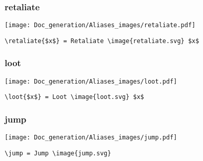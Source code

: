 \documentclass{article}
\begin{document}
\subsubsection{retaliate}
\begin{minipage}{0.45\linewidth}
\raggedright
\begin{spverbatim}
\end{spverbatim}
\end{minipage}
\begin{minipage}{0.45\linewidth}
\raggedleft
\texttt{[image: Doc\_generation/Aliases\_images/retaliate.pdf]}
\end{minipage}
\begin{center}
\begin{BVerbatim}
\retaliate{$x$} = Retaliate \image{retaliate.svg} $x$
\end{BVerbatim}
\end{center}

\subsubsection{loot}
\begin{minipage}{0.45\linewidth}
\raggedright
\begin{spverbatim}
\end{spverbatim}
\end{minipage}
\begin{minipage}{0.45\linewidth}
\raggedleft
\texttt{[image: Doc\_generation/Aliases\_images/loot.pdf]}
\end{minipage}
\begin{center}
\begin{BVerbatim}
\loot{$x$} = Loot \image{loot.svg} $x$
\end{BVerbatim}
\end{center}

\subsubsection{jump}
\begin{minipage}{0.45\linewidth}
\raggedright
\begin{spverbatim}
\jump 
\end{spverbatim}
\end{minipage}
\begin{minipage}{0.45\linewidth}
\raggedleft
\texttt{[image: Doc\_generation/Aliases\_images/jump.pdf]}
\end{minipage}
\begin{center}
\begin{BVerbatim}
\jump = Jump \image{jump.svg}
\end{BVerbatim}
\end{center}
\end{document}
